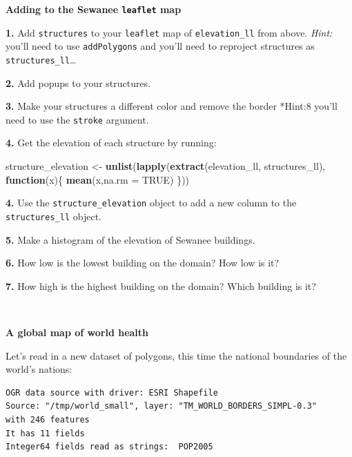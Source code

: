 \documentclass[]{book}
\newenvironment{Shaded}{\begin{snugshade}}{\end{snugshade}}
\newcommand{\ControlFlowTok}[1]{\textcolor[rgb]{0.13,0.29,0.53}{\textbf{#1}}}
\newcommand{\DataTypeTok}[1]{\textcolor[rgb]{0.13,0.29,0.53}{#1}}
\newcommand{\KeywordTok}[1]{\textcolor[rgb]{0.13,0.29,0.53}{\textbf{#1}}}
\newcommand{\NormalTok}[1]{#1}
\newcommand{\OtherTok}[1]{\textcolor[rgb]{0.56,0.35,0.01}{#1}}
\newcommand{\StringTok}[1]{\textcolor[rgb]{0.31,0.60,0.02}{#1}}
\begin{document}
\textbf{Adding to the Sewanee \texttt{leaflet} map}

\textbf{1.} Add \texttt{structures} to your \texttt{leaflet} map of \texttt{elevation\_ll} from above. \emph{Hint:} you'll need to use \texttt{addPolygons} and you'll need to reproject structures as \texttt{structures\_ll}\ldots{}

\textbf{2.} Add popups to your structures.

\textbf{3.} Make your structures a different color and remove the border *Hint:8 you'll need to use the \texttt{stroke} argument.

\textbf{4.} Get the elevation of each structure by running:

\begin{Shaded}
\begin{Highlighting}[]
\NormalTok{structure_elevation <-}\StringTok{ }
\StringTok{  }\KeywordTok{unlist}\NormalTok{(}\KeywordTok{lapply}\NormalTok{(}\KeywordTok{extract}\NormalTok{(elevation_ll, structures_ll),}
         \ControlFlowTok{function}\NormalTok{(x)\{}
           \KeywordTok{mean}\NormalTok{(x,}\DataTypeTok{na.rm =} \OtherTok{TRUE}\NormalTok{)}
\NormalTok{         \}))}
\end{Highlighting}
\end{Shaded}

\textbf{4.} Use the \texttt{structure\_elevation} object to add a new column to the \texttt{structures\_ll} object.

\textbf{5.} Make a histogram of the elevation of Sewanee buildings.

\textbf{6.} How low is the lowest building on the domain? How low is it?

\textbf{7.} How high is the highest building on the domain? Which building is it?

~

\textbf{A global map of world health}

Let's read in a new dataset of polygons, this time the national boundaries of the world's nations:

\begin{verbatim}
OGR data source with driver: ESRI Shapefile 
Source: "/tmp/world_small", layer: "TM_WORLD_BORDERS_SIMPL-0.3"
with 246 features
It has 11 fields
Integer64 fields read as strings:  POP2005 
\end{verbatim}
\end{document}
